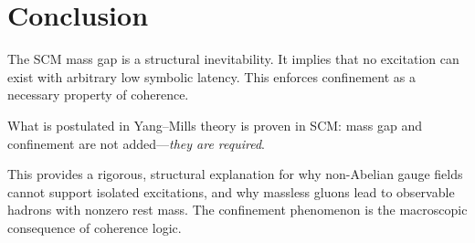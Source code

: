 \section{Conclusion}

The SCM mass gap is a structural inevitability. It implies that no excitation can exist with arbitrary low symbolic latency. This enforces confinement as a necessary property of coherence.

What is postulated in Yang--Mills theory is proven in SCM: mass gap and confinement are not added—\emph{they are required}.

This provides a rigorous, structural explanation for why non-Abelian gauge fields cannot support isolated excitations, and why massless gluons lead to observable hadrons with nonzero rest mass. The confinement phenomenon is the macroscopic consequence of coherence logic.

